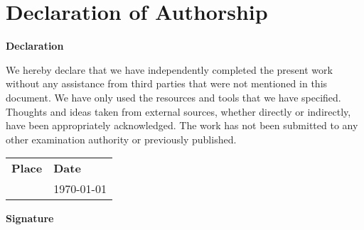 \section{Declaration of Authorship}
\vspace{0.8cm}
\textbf{Declaration}\

We hereby declare that we have independently completed the present work without any assistance from third parties that were not mentioned in this document. We have only used the resources and tools that we have specified. Thoughts and ideas taken from external sources, whether directly or indirectly, have been appropriately acknowledged. The work has not been submitted to any other examination authority or previously published.\
\vspace{0.8cm}\

\begin{tabular}{l l}
	\textbf{Place} & \textbf{Date} \\
	\Place & \today
\end{tabular}
\vspace{0.8cm}

\textbf{Signature}\
\vspace{0.2cm}
\AuthorOne \hspace{4cm} \AuthorTwo

\clearpage

